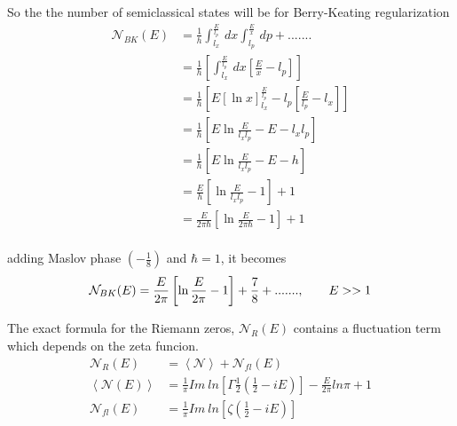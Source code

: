 \documentclass[12pt]{report}
\newcommand*{\1}{\hspace{1pt}}
\begin{document}
    So the the number of semiclassical states will be for Berry-Keating regularization 
    \begin{equation}
        \begin{split}
            \mathcal {N}_{BK}(E) &= \frac{1}{h}\int_{l_{x}}^{\frac{E}{l_{p}}}  \,dx \int_{l_{p}}^{\frac{E}{x}}  \,dp + ....... \\
            &= \frac{1}{h}\left[\int_{l_{x}}^{\frac{E}{l_{p}}}  \,dx \left[\frac{E}{x} - l_{p}\right] \right]  \\
            &= \frac{1}{h}\left[E\left[\ln x\right] ^{\frac{E}{l_{p}}} _{l_{x}} - l_{p}\left[\frac{E}{l_{p}} - l_{x}\right] \right]  \\
            &= \frac{1}{h}\left[E\ln \frac{E}{l_{x}l_{p}}  - E - l_{x}l_{p} \right]  \\
            &= \frac{1}{h}\left[E\ln \frac{E}{l_{x}l_{p}}  - E - h \right]  \\
            &= \frac{E}{h}\left[\ln \frac{E}{l_{x}l_{p}}  - 1 \right]  + 1 \\
            &= \frac{E}{2 \pi \hbar}\left[\ln \frac{E}{2 \pi \hbar}  - 1 \right]  + 1 \\
        \end{split}
    \end{equation}

    adding Maslov phase $(-\frac{1}{8})$ and $\hbar = 1$, it becomes 
    \begin{equation}
        \mathcal {N}_{BK}(E) = \frac{E}{2 \pi}\left[\ln \frac{E}{2\pi}  - 1 \right]  + \frac{7}{8} + .......,  \ \ \ \ \ \ E>>1\\
    \end{equation}

    The exact formula for the Riemann zeros, $\mathcal{N}_{R} (E)$ contains a fluctuation term which depends on the zeta funcion.\cite{s3}  
    \begin{equation}
        \begin{split}
            \mathcal{N}_{R} (E) &= \left\langle \mathcal{N}\right\rangle + \mathcal{N}_{fl} (E) \\
            \left\langle\mathcal{N} (E)\right\rangle &= \frac{1}{\pi} Im \ ln \left[\Gamma\frac{1}{2}\left(\frac{1}{2}-iE\right) \right] - \frac{E}{2 \pi} ln \pi + 1  \\
            \mathcal {N} _{fl} (E) &= \frac{1}{\pi} Im \ ln \left[\zeta\left(\frac{1}{2} - iE \right)\right]
        \end{split}
    \end{equation}
\end{document}
